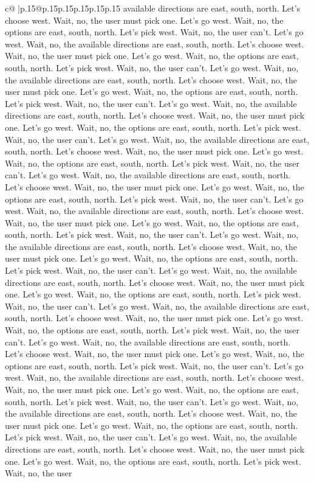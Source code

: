 \documentclass{article}
\begin{document}
{\begin{supertabular}{c@{$\;$}|p{.15\linewidth}@{}p{.15\linewidth}p{.15\linewidth}p{.15\linewidth}p{.15\linewidth}p{.15\linewidth}}
{{{available directions are east, south, north. Let's choose west. Wait, no, the user must pick one. Let's go west. Wait, no, the options are east, south, north. Let's pick west. Wait, no, the user can't. Let's go west. Wait, no, the available directions are east, south, north. Let's choose west. Wait, no, the user must pick one. Let's go west. Wait, no, the options are east, south, north. Let's pick west. Wait, no, the user can't. Let's go west. Wait, no, the available directions are east, south, north. Let's choose west. Wait, no, the user must pick one. Let's go west. Wait, no, the options are east, south, north. Let's pick west. Wait, no, the user can't. Let's go west. Wait, no, the available directions are east, south, north. Let's choose west. Wait, no, the user must pick one. Let's go west. Wait, no, the options are east, south, north. Let's pick west. Wait, no, the user can't. Let's go west. Wait, no, the available directions are east, south, north. Let's choose west. Wait, no, the user must pick one. Let's go west. Wait, no, the options are east, south, north. Let's pick west. Wait, no, the user can't. Let's go west. Wait, no, the available directions are east, south, north. Let's choose west. Wait, no, the user must pick one. Let's go west. Wait, no, the options are east, south, north. Let's pick west. Wait, no, the user can't. Let's go west. Wait, no, the available directions are east, south, north. Let's choose west. Wait, no, the user must pick one. Let's go west. Wait, no, the options are east, south, north. Let's pick west. Wait, no, the user can't. Let's go west. Wait, no, the available directions are east, south, north. Let's choose west. Wait, no, the user must pick one. Let's go west. Wait, no, the options are east, south, north. Let's pick west. Wait, no, the user can't. Let's go west. Wait, no, the available directions are east, south, north. Let's choose west. Wait, no, the user must pick one. Let's go west. Wait, no, the options are east, south, north. Let's pick west. Wait, no, the user can't. Let's go west. Wait, no, the available directions are east, south, north. Let's choose west. Wait, no, the user must pick one. Let's go west. Wait, no, the options are east, south, north. Let's pick west. Wait, no, the user can't. Let's go west. Wait, no, the available directions are east, south, north. Let's choose west. Wait, no, the user must pick one. Let's go west. Wait, no, the options are east, south, north. Let's pick west. Wait, no, the user can't. Let's go west. Wait, no, the available directions are east, south, north. Let's choose west. Wait, no, the user must pick one. Let's go west. Wait, no, the options are east, south, north. Let's pick west. Wait, no, the user can't. Let's go west. Wait, no, the available directions are east, south, north. Let's choose west. Wait, no, the user must pick one. Let's go west. Wait, no, the options are east, south, north. Let's pick west. Wait, no, the user can't. Let's go west. Wait, no, the available directions are east, south, north. Let's choose west. Wait, no, the user must pick one. Let's go west. Wait, no, the options are east, south, north. Let's pick west. Wait, no, the user }}}
\end{supertabular}}
\end{document}
